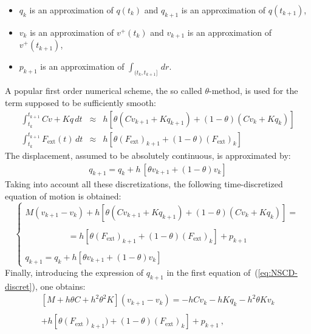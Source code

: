 \begin{itemize}
\item $q_{k}$ is an approximation of $q(t_{k})$ and $q_{k+1}$ is an approximation of $q(t_{k+1})$, 

\item $v_{k}$ is an approximation of $v^+(t_{k})$ and $v_{k+1}$ is an approximation of $v^+(t_{k+1})$, 

\item $p_{k+1}$ is an approximation of $ \displaystyle \int_{(t_k,t_{k+1}]} \,dr$. 
\end{itemize}
%
A popular first order numerical scheme, the so called $\theta$-method, is used for the term supposed to be sufficiently smooth:
\begin{eqnarray}
  \displaystyle \int_{t_k}^{t_{k+1}} C v + K q \,dt  &\approx& 
  h \left[ \theta (C v_{k+1}+K q_{k+1}) + (1-\theta) (C v_{k}+K q_{k}) \right]   \nonumber \\
  \displaystyle \int_{t_k}^{t_{k+1}} F_{\mathrm{ext}}(t) \,dt &\approx& 
  h\left[\theta  (F_{\mathrm{ext}})_{k+1}+(1-\theta)  (F_{\mathrm{ext}})_{k}  \right]  \nonumber 
\end{eqnarray}
The displacement, assumed to be absolutely continuous, is approximated by:
\begin{eqnarray}
&  q_{k+1} = q_{k} +  h\,\left[\theta v_{k+1}+(1-\theta) v_{k}  \right] & \nonumber
\end{eqnarray}
Taking into account all these discretizations, the following time-discretized equation of motion is obtained:
\begin{equation}
\label{eq:NSCD-discret}
\begin{cases}
    M (v_{k+1}-v_{k}) + h\left[\theta  (C  v_{k+1}+K q_{k+1}) + (1-\theta) (C v_{k}+K q_{k})  \right] = \\ \\
    \quad\quad\quad\quad\quad = h\left[\theta  (F_{\mathrm{ext}})_{k+1}+(1-\theta)  (F_{\mathrm{ext}})_{k}  \right] + p_{k+1} \\  \\
    q_{k+1} = q_{k} +  h\left[\theta v_{k+1}+(1-\theta) v_{k} \right]
\end{cases}
\end{equation}
Finally, introducing the expression of $q_{k+1}$ in the first equation of~(\ref{eq:NSCD-discret}), one obtains:
\begin{eqnarray}
  \label{eq:23}
&  \left[M+h\theta C + h^2 \theta^2 K\right] (v_{k+1} -v_{k}) = - h  C v_{k} - h K q_{k} - h^2 \theta  K v_{k} & \nonumber \\ \nonumber \\
&+  h\left[\theta  (F_{\mathrm{ext}})_{k+1})+(1-\theta)  (F_{\mathrm{ext}})_{k}  \right]  + p_{k+1}  \:, &
\end{eqnarray}

